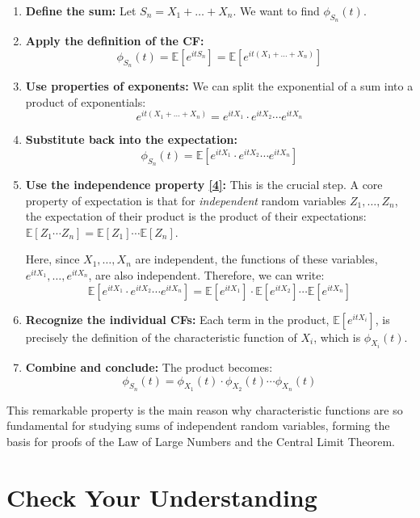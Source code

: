 \documentclass[11pt,a4paper]{article}
\begin{document}
\begin{enumerate}
    \item \textbf{Define the sum:} Let $S_n = X_1 + \dots + X_n$. We want to find $\phi_{S_n}(t)$.
    \item \textbf{Apply the definition of the CF:}
    \[ \phi_{S_n}(t) = \mathbb{E}[e^{itS_n}] = \mathbb{E}[e^{it(X_1 + \dots + X_n)}] \]
    \item \textbf{Use properties of exponents:} We can split the exponential of a sum into a product of exponentials:
    \[ e^{it(X_1 + \dots + X_n)} = e^{itX_1} \cdot e^{itX_2} \cdots e^{itX_n} \]
    \item \textbf{Substitute back into the expectation:}
    \[ \phi_{S_n}(t) = \mathbb{E}[e^{itX_1} \cdot e^{itX_2} \cdots e^{itX_n}] \]
    \item \textbf{Use the independence property \hyperlink{note4}{[4]}:} This is the crucial step. A core property of expectation is that for \textit{independent} random variables $Z_1, \ldots, Z_n$, the expectation of their product is the product of their expectations: $\mathbb{E}[Z_1 \cdots Z_n] = \mathbb{E}[Z_1]\cdots\mathbb{E}[Z_n]$.

    Here, since $X_1, \ldots, X_n$ are independent, the functions of these variables, $e^{itX_1}, \ldots, e^{itX_n}$, are also independent. Therefore, we can write:
    \[ \mathbb{E}[e^{itX_1} \cdot e^{itX_2} \cdots e^{itX_n}] = \mathbb{E}[e^{itX_1}] \cdot \mathbb{E}[e^{itX_2}] \cdots \mathbb{E}[e^{itX_n}] \]
    \item \textbf{Recognize the individual CFs:} Each term in the product, $\mathbb{E}[e^{itX_i}]$, is precisely the definition of the characteristic function of $X_i$, which is $\phi_{X_i}(t)$.
    \item \textbf{Combine and conclude:} The product becomes:
    \[ \phi_{S_n}(t) = \phi_{X_1}(t) \cdot \phi_{X_2}(t) \cdots \phi_{X_n}(t) \]
\end{enumerate}
This remarkable property is the main reason why characteristic functions are so fundamental for studying sums of independent random variables, forming the basis for proofs of the Law of Large Numbers and the Central Limit Theorem.

\section{Check Your Understanding}
\end{document}
